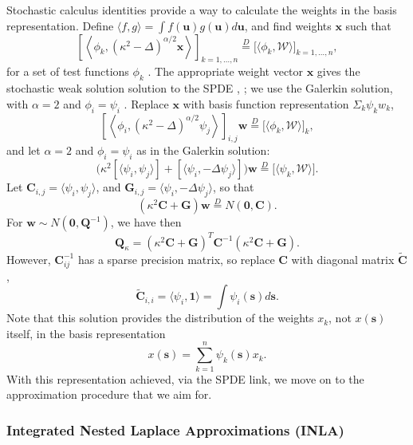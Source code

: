 \documentclass{article}
\begin{document}
Stochastic calculus identities provide a way to calculate the weights in the basis representation. Define $\langle f, g \rangle = \int f(\pmb{u}) g(\pmb{u}) d\pmb{u}$, and find weights $\pmb{x}$ such that
$$ \left[ \left< \phi_{k}, (\kappa^{2} - \Delta)^{\alpha/2} \pmb{x} \right> \right]_{k = 1, \hdots, n} \overset{D}{=} \Big[ \langle \phi_{k}, \mathcal{W} \rangle \Big]_{k = 1, \hdots, n},$$
for a set of test functions $\phi_{k}$ \citep{Lindgren2011}. The appropriate weight vector $\pmb{x}$ gives the stochastic weak solution solution to the SPDE \citep{Mao2007}, \cite{Lindstrom2014}; we use the Galerkin solution, with $\alpha = 2$ and $\phi_{i} = \psi_{i}$ \citep{Lindgren2011}. Replace $\pmb{x}$ with basis function representation $\Sigma_{k}\psi_{k}w_{k}$,
$$ \left[ \left< \phi_{i}, (\kappa^{2} - \Delta)^{\alpha/2} \psi_{j} \right> \right]_{i,j}\pmb{w} \overset{D}{=} \Big[ \langle \phi_{k}, \mathcal{W} \rangle \Big]_{k}, $$
and let $\alpha = 2$ and $\phi_{i} = \psi_{i}$ as in the Galerkin solution:
$$ \Big(
\kappa^{2} [ \langle \psi_{i}, \psi_{j} \rangle ] + [ \langle \psi_{i}, -\Delta \psi_{j} \rangle ]
\Big) \pmb{w} \overset{D}{=} \Big[ \langle \psi_{k}, \mathcal{W} \rangle \Big]. $$
Let $\pmb{C}_{i,j} = \langle \psi_{i}, \psi_{j} \rangle$, and $ \pmb{G}_{i,j} = \langle \psi_{i}, - \Delta \psi_{j} \rangle$, so that
$$ \left(
\kappa^{2} \pmb{C} + \pmb{G} \right) \pmb{w} \overset{D}{=} N(\pmb{0},\pmb{C}).$$
For $\pmb{w} \sim N(\pmb{0}, \pmb{Q}^{-1})$, we have then
$$\pmb{Q}_{\kappa} = \left( \kappa^{2} \pmb{C} + \pmb{G} \right)^{T} \pmb{C}^{-1} \left( \kappa^{2} \pmb{C} + \pmb{G} \right).$$ 
However, $\pmb{C}_{ij}^{-1}$ has a sparse precision matrix, so replace $\pmb{C}$ with diagonal matrix $\widetilde{\pmb{C}}$,
$$ \widetilde{\pmb{C}}_{i,i} = \langle \psi_{i}, \pmb{1} \rangle = \int \psi_{i}(\pmb{s}) d\pmb{s}.$$ 
Note that this solution provides the distribution of the weights $x_{k}$, not $x(\pmb{s})$ itself, in the basis representation
$$ x(\pmb{s}) = \sum_{k=1}^{n} \psi_{k}(\pmb{s})x_{k}.$$
With this representation achieved, via the SPDE link, we move on to the approximation procedure that we aim for.

\subsubsection{Integrated Nested Laplace Approximations (INLA)}
\end{document}
